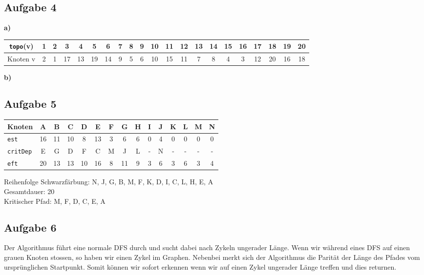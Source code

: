 \documentclass[a4paper,graphics,11pt]{article}
\newcommand{\aufgabe}[1]{\subsection*{Aufgabe #1}}
\begin{document}
\aufgabe{4}
\textbf{a)}

\begin{tabular}{c|*{19}{c|}c}
    \texttt{topo}(v) & 1 & 2 & 3 & 4 & 5 & 6 & 7 & 8 & 9 & 10 & 11 & 12 & 13 & 14 & 15 & 16 & 17 & 18 & 19 & 20\\
    \hline
    Knoten v & 2 & 1 & 17 & 13 & 19 & 14 & 9 & 5 & 6 & 10 & 15 & 11 & 7 & 8 & 4 & 3 & 12 & 20 & 16 & 18
\end{tabular}

\textbf{b)}


\aufgabe{5}

\begin{center}
\begin{tabular}{l|*{13}{c|}c}
    Knoten & A & B & C & D & E & F & G & H & I & J & K & L & M & N\\
    \hline
    \texttt{est}    & 16 & 11 & 10 & 8 & 13 & 3 & 6 & 6 & 0 & 4 & 0 & 0 & 0 & 0\\
    \hline
    \texttt{critDep}& E & G & D & F & C & M & J & L & - & N & - & - & - & -\\
    \hline
    \texttt{eft}    & 20 & 13 & 13 & 10 & 16 & 8 & 11 & 9 & 3 & 6 & 3 & 6 & 3 & 4\\
\end{tabular}
\end{center}
Reihenfolge Schwarzfärbung: N, J, G, B, M, F, K, D, I, C, L, H, E, A\\
Gesamtdauer: 20\\
Kritischer Pfad: M, F, D, C, E, A

\aufgabe{6}



Der Algorithmus führt eine normale DFS durch und sucht dabei nach Zykeln ungerader Länge.
Wenn wir während eines DFS auf einen grauen Knoten stossen, so haben wir einen Zykel im Graphen.
Nebenbei merkt sich der Algorithmus die Parität der Länge des Pfades vom ursprünglichen Startpunkt.
Somit können wir sofort erkennen wenn wir auf einen Zykel ungerader Länge treffen und dies returnen.
\end{document}
